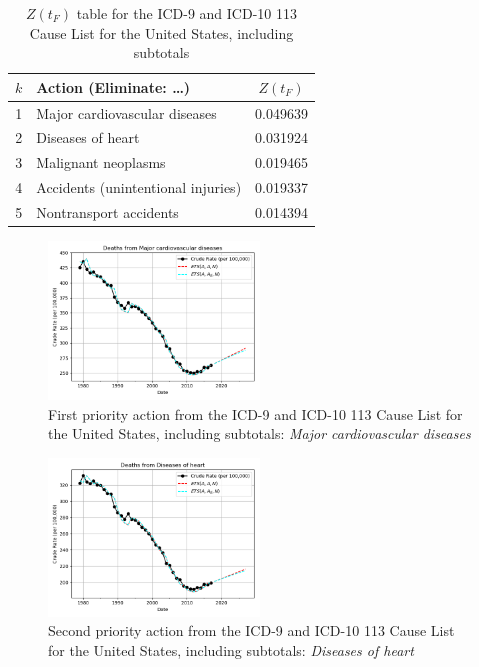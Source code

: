 \documentclass[10pt, a4paper, twocolumn]{IEEEconf}
\begin{document}
\begin{table}[H]
  \centering
  \begin{tabular}{clc}
    \toprule
      $k$ & Action (Eliminate: \ldots) & $Z(t_F)$ \\
    \midrule
      1 &      Major cardiovascular diseases & 0.049639 \\
      2 &                  Diseases of heart & 0.031924 \\
      3 &                Malignant neoplasms & 0.019465 \\
      4 & Accidents (unintentional injuries) & 0.019337 \\
      5 &             Nontransport accidents & 0.014394 \\
  \end{tabular}
  \caption{$Z(t_F)$ table for the ICD-9 and ICD-10 113 Cause List for the United States, including subtotals}
  \label{table:ztable2}
\end{table}

\begin{figure}[H]
  \centering
  \includegraphics[width=0.5\textwidth]{results/US_ICD_113_SELECTED_CAUSES_ALL/Major_cardiovascular_diseases_ets.png}
  \caption{First priority action from the ICD-9 and ICD-10 113 Cause List for the United States, including subtotals: \textit{Major cardiovascular diseases}}\label{fig:k3a}
\end{figure}

\begin{figure}[H]
  \centering
  \includegraphics[width=0.5\textwidth]{results/US_ICD_113_SELECTED_CAUSES_ALL/Diseases_of_heart_ets.png}
  \caption{Second priority action from the ICD-9 and ICD-10 113 Cause List for the United States, including subtotals: \textit{Diseases of heart}}\label{fig:k3b}
\end{figure}
\end{document}
